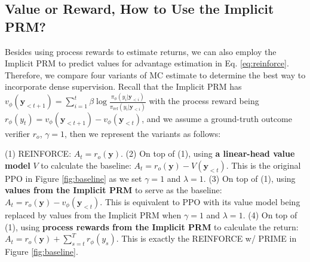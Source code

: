 \subsection{Value or Reward, How to Use the Implicit PRM? }
\label{sec:ppo}



Besides using process rewards to estimate returns, we can also employ the Implicit PRM to predict values for advantage estimation in Eq. \ref{eq:reinforce}.
Therefore, we compare four variants of MC estimate to determine the best way to incorporate dense supervision.
Recall that the Implicit PRM has $v_{\phi}(\mathbf{y}_{<t+1}) = \sum_{i=1}^{t} \beta \log \frac{\pi_\phi(y_{i}|\mathbf{y}_{<i})}{\pi_\text{ref}(y_{i}|\mathbf{y}_{<i})}$ with the process reward being $r_{\phi}(y_t) = v_{\phi}(\mathbf{y}_{<t+1}) - v_{\phi}(\mathbf{y}_{<t})$, and we assume a ground-truth outcome verifier $r_o$, $\gamma=1$, then we represent the variants as follows:

(1) REINFORCE: $A_t = r_o(\mathbf{y})$.
(2) On top of (1), using \textbf{a linear-head value model} $V$ to calculate the baseline: $A_t = r_o(\mathbf{y}) - V(\mathbf{y}_{<t})$. This is the original PPO in Figure \ref{fig:baseline} as we set $\gamma=1$ and $\lambda=1$.
(3) On top of (1), using \textbf{values from the Implicit PRM} to serve as the baseline: $A_t = r_o(\mathbf{y}) - v_\phi(\mathbf{y}_{<t})$. This is equivalent to PPO with its value model being replaced by values from the Implicit PRM when $\gamma=1$ and $\lambda=1$.
(4) On top of (1), using \textbf{process rewards from the Implicit PRM} to calculate the return: $A_t = r_o(\mathbf{y}) + \sum_{s=t}^T r_{\phi}(y_s) $. This is exactly the REINFORCE w/ PRIME in Figure \ref{fig:baseline}.









